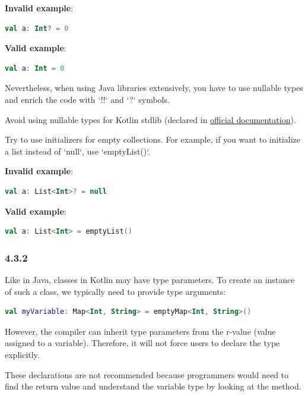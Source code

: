 {{{{\textbf{Invalid example}:

\begin{lstlisting}[language=Kotlin]
val a: Int? = 0
\end{lstlisting}


\textbf{Valid example}:

\begin{lstlisting}[language=Kotlin]
val a: Int = 0
\end{lstlisting}


Nevertheless, when using Java libraries extensively, you have to use nullable types and enrich the code with `!!` and `?` symbols.

Avoid using nullable types for Kotlin stdlib (declared in \href{https://kotlinlang.org/api/latest/jvm/stdlib/kotlin.collections/}{official documentation}). 

Try to use initializers for empty collections. For example, if you want to initialize a list instead of `null`, use `emptyList()`.



\textbf{Invalid example}:

\begin{lstlisting}[language=Kotlin]
val a: List<Int>? = null 
\end{lstlisting}


\textbf{Valid example}:

\begin{lstlisting}[language=Kotlin]
val a: List<Int> = emptyList()
\end{lstlisting}


\subsubsection*{\textbf{4.3.2}}
\leavevmode\newline

Like in Java, classes in Kotlin may have type parameters. To create an instance of such a class, we typically need to provide type arguments:



\begin{lstlisting}[language=Kotlin]
val myVariable: Map<Int, String> = emptyMap<Int, String>() 
\end{lstlisting}


However, the compiler can inherit type parameters from the r-value (value assigned to a variable). Therefore, it will not force users to declare the type explicitly.

These declarations are not recommended because programmers would need to find the return value and understand the variable type by looking at the method.



}}}}

